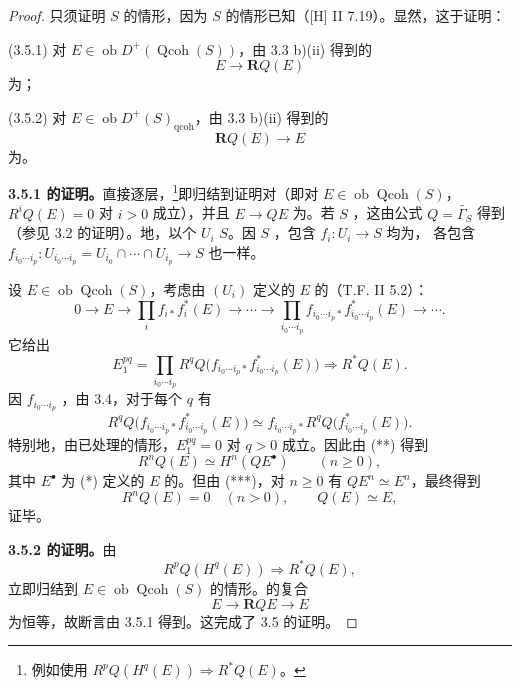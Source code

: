 \begin{proof}
只须证明 $S$ 的情形，因为 $S$ 的情形已知（[H] II 7.19）。显然，这于证明：

(3.5.1) 对 $E\in\operatorname{ob}D^+(\operatorname{Qcoh}(S))$，由 3.3 b)(ii) 得到的
\[
E\longrightarrow\mathbf RQ(E)
\]
为；

(3.5.2) 对 $E\in\operatorname{ob}D^+(S)_{\mathrm{qcoh}}$，由 3.3 b)(ii) 得到的
\[
\mathbf RQ(E)\longrightarrow E
\]
为。

\textbf{3.5.1 的证明。}直接逐层，\footnote{例如使用 $R^pQ(H^q(E))\Longrightarrow R^*Q(E)$。}即归结到证明对（即对 $E\in\operatorname{ob}\operatorname{Qcoh}(S)$，$R^iQ(E)=0$ 对 $i>0$ 成立），并且 $E\to QE$ 为。若 $S$ ，这由公式 $Q=\widetilde{\Gamma_S}$ 得到（参见 3.2 的证明）。地，以个 $U_i$  $S$。因 $S$ ，包含 $f_i:U_i\to S$ 均为，
各包含 $f_{i_0\cdots i_p}:U_{i_0\cdots i_p}=U_{i_0}\cap\cdots\cap U_{i_p}\to S$ 也一样。

设 $E\in\operatorname{ob}\operatorname{Qcoh}(S)$，考虑由 $(U_i)$ 定义的 $E$ 的（T.F. II 5.2）：
\[
0\longrightarrow E\longrightarrow\prod_i f_{i*}f_i^*(E)\longrightarrow\cdots\longrightarrow\prod_{i_0\cdots i_p}f_{i_0\cdots i_p*}f_{i_0\cdots i_p}^*(E)\longrightarrow\cdots.\tag{*}
\]
它给出
\[
E_1^{pq}=\prod_{i_0\cdots i_p}R^qQ\bigl(f_{i_0\cdots i_p*}f_{i_0\cdots i_p}^*(E)\bigr)\Longrightarrow R^*Q(E).\tag{**}
\]
因 $f_{i_0\cdots i_p}$ ，由 3.4，对于每个 $q$ 有
\[
R^qQ\bigl(f_{i_0\cdots i_p*}f_{i_0\cdots i_p}^*(E)\bigr)
\simeq f_{i_0\cdots i_p*}R^qQ\bigl(f_{i_0\cdots i_p}^*(E)\bigr).\tag{***}
\]
特别地，由已处理的情形，$E_1^{pq}=0$ 对 $q>0$ 成立。因此由 (**) 得到
\[
R^nQ(E)\simeq H^n(QE^\bullet)\qquad(n\geq0),
\]
其中 $E^\bullet$ 为 (*) 定义的 $E$ 的。但由 (***)，对 $n\geq0$ 有 $QE^n\simeq E^n$，最终得到
\[
R^nQ(E)=0\quad(n>0),\qquad Q(E)\simeq E,
\]
证毕。

\textbf{3.5.2 的证明。}由
\[
R^pQ(H^q(E))\Longrightarrow R^*Q(E),
\]
立即归结到 $E\in\operatorname{ob}\operatorname{Qcoh}(S)$ 的情形。的复合
\[
E\longrightarrow\mathbf RQE\longrightarrow E
\]
为恒等，故断言由 3.5.1 得到。这完成了 3.5 的证明。
\end{proof}
